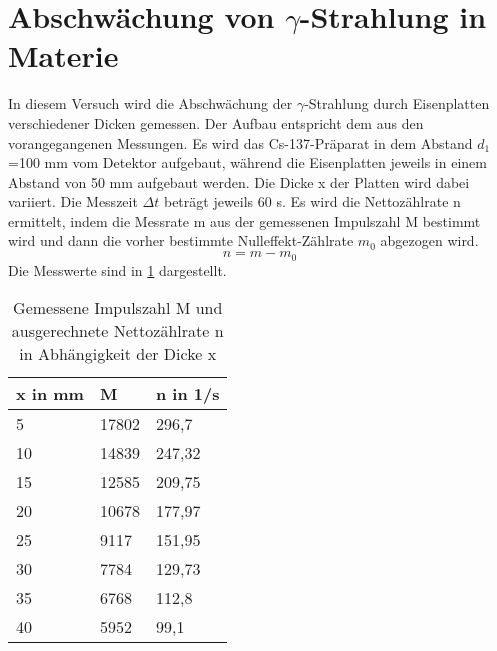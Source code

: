 \documentclass[../protokoll.tex]{subfiles}
\begin{document}
\section{Abschwächung von \texorpdfstring{$\gamma$}{Gamma}-Strahlung in Materie}\label{sec:Abschwächung Gamma-Strahlung}
In diesem Versuch wird die Abschwächung der $\gamma$-Strahlung durch Eisenplatten verschiedener Dicken gemessen. Der Aufbau entspricht dem aus den vorangegangenen Messungen. Es wird das Cs-137-Präparat in dem Abstand $d_1$=100 mm vom Detektor aufgebaut, während die Eisenplatten jeweils in einem Abstand von 50 mm aufgebaut werden. Die Dicke x der Platten wird dabei variiert. Die Messzeit $\Delta t$ beträgt jeweils 60 s. Es wird die Nettozählrate n ermittelt, indem die Messrate m aus der gemessenen Impulszahl M bestimmt wird und dann die vorher bestimmte Nulleffekt-Zählrate $m_0$ abgezogen wird.
\begin{equation}
        n=m-m_0
\end{equation}
Die Messwerte sind in \ref{tab3} dargestellt.
\begin{table}[h]
\centering
\begin{tabular}{|l|l|l|}
\hline
x in mm & M     & n in 1/s \\ \hline
5       & 17802 & 296,7    \\ \hline
10      & 14839 & 247,32   \\ \hline
15      & 12585 & 209,75   \\ \hline
20      & 10678 & 177,97   \\ \hline
25      & 9117  & 151,95   \\ \hline
30      & 7784  & 129,73   \\ \hline
35      & 6768  & 112,8    \\ \hline
40      & 5952  & 99,1     \\ \hline
\end{tabular}
\caption{Gemessene Impulszahl M und ausgerechnete Nettozählrate n in Abhängigkeit der Dicke x}
\label{tab3}
\end{table}
\end{document}
